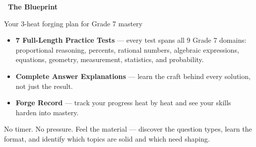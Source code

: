 
\thispagestyle{empty}

{
\sffamily

\begin{center}
    \textcolor{funOrangeDark}{\fontsize{26}{30}\selectfont\bfseries
    \faHammer~The Blueprint~\faHammer}

    \smallskip
    \textcolor{funGray}{\normalsize Your 3-heat forging plan for Grade 7 mastery}
\end{center}

\vspace{3mm}

\begin{tcolorbox}[
    enhanced,
    colback=funOrangeLight,
    colframe=funOrange!50,
    arc=8pt, boxrule=1.2pt,
    left=5mm, right=5mm, top=3mm, bottom=3mm,
    title={\textcolor{white}{\faClipboardList~What's in The Forge}},
    colbacktitle=funOrangeDark!80,
    fonttitle=\bfseries\sffamily,
]
    \small
    \begin{itemize}[leftmargin=*, itemsep=3pt]
        \item \textbf{7 Full-Length Practice Tests} --- every test spans all 9
            Grade 7 domains: proportional reasoning, percents, rational numbers,
            algebraic expressions, equations, geometry, measurement,
            statistics, and probability.
        \item \textbf{Complete Answer Explanations} --- learn the craft behind
            every solution, not just the result.
        \item \textbf{Forge Record} --- track your progress heat by heat and
            see your skills harden into mastery.
    \end{itemize}
\end{tcolorbox}

\vspace{2mm}

\begin{tcolorbox}[
    enhanced,
    colback=funRed!6,
    colframe=funRed!45,
    arc=6pt, boxrule=2pt,
    left=5mm, right=5mm, top=3mm, bottom=3mm,
    width=0.78\linewidth,
    title={\textcolor{white}{\faFire~Heat I: Warm the Metal (Tests 1--2)}},
    colbacktitle=funRed!70,
    fonttitle=\bfseries\sffamily,
]
    \small
    No timer. No pressure. Feel the material --- discover
    the question types, learn the format, and identify
    which topics are solid and which need shaping.
\end{tcolorbox}

}
